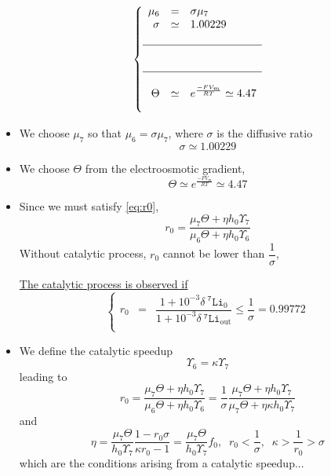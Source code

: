 \documentclass[aps,onecolumn,10pt]{revtex4}
\newcommand{\mychem}[1]{\mathtt{#1}}
\newcommand{\spLi}[1]{{~^{\mychem{#1}}\mychem{Li}}}
\newcommand{\deltaLi}{ {\delta\!\!\!\spLi{7}} }
\newcommand{\deltaLiOut}{{\deltaLi}_{\mathrm{out}}}
\begin{document}
\begin{equation}
\left\lbrace
\begin{array}{rcl}
		\mu_6     & = & \sigma \mu_7\\
		\sigma    & \simeq & 1.00229 \\
		\\
		\hline
		\\
		\\
		\hline
		\\
		\Theta     & \simeq  & e^{\frac{-F V_m}{RT} } \simeq 4.47\\
		\\
\end{array}
\right.
\end{equation}

\begin{itemize}
\item We choose $\mu_7$ so that $\mu_6=\sigma\mu_7$, where $\sigma$ is the diffusive ratio
	\begin{equation}
		\sigma     \simeq 1.00229 
	\end{equation}
	
\item We choose $\Theta$ from the electroosmotic gradient, 
\begin{equation}
	\Theta    \simeq   e^{\frac{-F V_m}{RT} } \simeq 4.47
\end{equation}

\item Since we must satisfy \eqref{eq:r0},
\begin{equation}
	r_0 = \dfrac{\mu_7\Theta+\eta h_0 \Upsilon_7}{\mu_6\Theta+\eta h_0 \Upsilon_6}
\end{equation}
Without catalytic process, $r_0$ cannot be lower than $\dfrac{1}{\sigma}$,


\underline{The catalytic process is observed if}
\begin{equation}
\boxed{
\left\lbrace
\begin{array}{rcl}
	r_0 & = & \dfrac{1+10^{-3}\deltaLi_0}{1+10^{-3}\deltaLiOut} \leq \dfrac{1}{\sigma} = 0.99772\\
\end{array}
\right.
}
\end{equation}
\item 
We define the catalytic speedup
\begin{equation}
	\Upsilon_6  = \kappa \Upsilon_7
\end{equation}
leading to
\begin{equation}
	r_0 =  \dfrac{\mu_7\Theta+\eta h_0 \Upsilon_7}{\mu_6\Theta+\eta h_0 \Upsilon_6} = \dfrac{1}{\sigma} \dfrac{\mu_7\Theta+\eta h_0 \Upsilon_7}{\mu_7\Theta+\eta \kappa h_0 \Upsilon_7}
\end{equation}
and
\begin{equation}
	\boxed{
	\eta = \dfrac{\mu_7\Theta}{h_0\Upsilon_7} \dfrac{1-r_0\sigma}{\kappa r_0-1} = \dfrac{\mu_7\Theta}{h_0\Upsilon_7} f_0
	,\;\; r_0 < \frac{1}{\sigma}, \;\; \kappa > \frac{1}{r_0} > \sigma
	}
\end{equation}
which are the conditions arising from a catalytic speedup...


\end{itemize}
\end{document}
